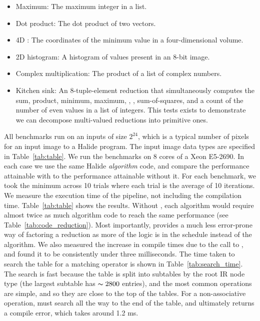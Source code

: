 \begin{itemize}
\item Maximum: The maximum integer in a list.
\item Dot product: The dot product of two vectors.
\item 4D : The coordinates of the minimum value in a four-dimensional volume.
\item 2D histogram: A histogram of values present in an 8-bit image.
\item Complex multiplication: The product of a list of complex numbers.
\item Kitchen sink: An 8-tuple-element reduction that simultaneously computes the sum, product, minimum, maximum, , , sum-of-squares, and a count of the number of even values in a list of integers. This tests exists to demonstrate we can decompose multi-valued reductions into primitive ones.
\end{itemize}

All benchmarks run on an inputs of size $2^{24}$, which is a typical number of pixels for an input image to a Halide program. The input image data types are specified in Table~\ref{tab:table}. We run the benchmarks on 8 cores of a Xeon E5-2690. In each case we use the same Halide \emph{algorithm} code, and compare the performance attainable with  to the performance attainable without it. For each benchmark, we took the minimum across 10 trials where each trial is the average of 10 iterations. We measure the execution time of the pipeline, not including the compilation time. Table~\ref{tab:table} shows the results. Without , each algorithm would require almost twice as much algorithm code to reach the same performance (see Table~\ref{tab:code_reduction}). Most importantly,  provides a much less error-prone way of factoring a reduction as more of the logic is in the schedule instead of the algorithm. We also measured the increase in compile times due to the call to , and found it to be consistently under three milliseconds. The time taken to search the table for a matching operator is shown in Table~\ref{tab:search_time}. The search is fast because the table is split into subtables by the root IR node type (the largest subtable has $\thicksim 2800$ entries), and the most common operations are simple, and so they are close to the top of the tables. For a non-associative operation,  must search all the way to the end of the table, and ultimately returns a compile error, which takes around 1.2 ms.

